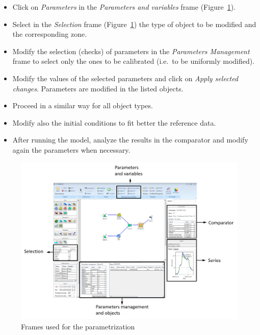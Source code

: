 \documentclass[
  letterpaper,
  DIV=11,
  numbers=noendperiod]{scrreprt}
\begin{document}
\begin{itemize}
\item
  {Click on \emph{Parameters} in the \emph{Parameters and variables}
  frame (Figure~\ref{fig-frames_parametrization}).}
\item
  {Select in the \emph{Selection} frame
  (Figure~\ref{fig-frames_parametrization}) the type of object to be
  modified and the corresponding zone.}
\item
  {Modify the selection (checks) of parameters in the \emph{Parameters
  Management} frame to select only the ones to be calibrated (i.e.~to be
  uniformly modified).}
\item
  {Modify the values of the selected parameters and click on \emph{Apply
  selected changes}. Parameters are modified in the listed objects.}
\item
  {Proceed in a similar way for all object types.}
\item
  {Modify also the initial conditions to fit better the reference data.}
\item
  {After running the model, analyze the results in the comparator and
  modify again the parameters when necessary.}
\end{itemize}

\begin{figure}

{\centering \includegraphics{./figures/fig-frames_parametrization.png}

}

\caption{\label{fig-frames_parametrization}Frames used for the
parametrization}

\end{figure}
\end{document}
